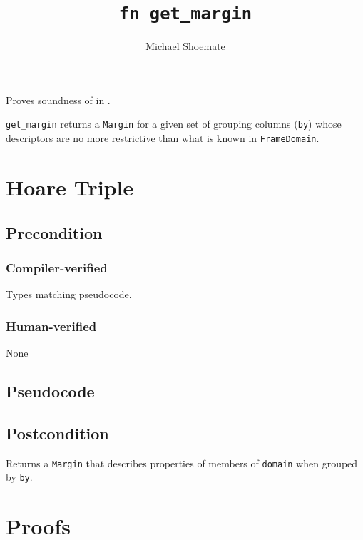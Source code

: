 \documentclass{article}
\title{\texttt{fn get\_margin}}
\author{Michael Shoemate}
\date{}
\begin{document}
\maketitle

\contrib
Proves soundness of  in .

\texttt{get\_margin} returns a \texttt{Margin} for a given set of grouping columns (\texttt{by})
whose descriptors are no more restrictive than what is known in \texttt{FrameDomain}.

\section{Hoare Triple}
\subsection*{Precondition}
\subsubsection*{Compiler-verified}
Types matching pseudocode.

\subsubsection*{Human-verified}
None

\subsection*{Pseudocode}


\subsection*{Postcondition}
Returns a \texttt{Margin} that describes properties of members of \texttt{domain} when grouped by \texttt{by}.

\section{Proofs}
\end{document}
